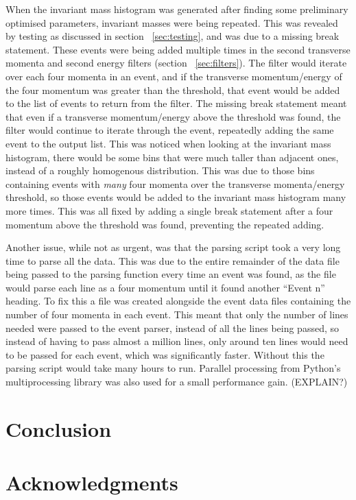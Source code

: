 \documentclass[11pt]{amsart}
\begin{document}
\begin{multicols}{2}
When the invariant mass histogram was generated after finding some preliminary optimised parameters, invariant masses were being repeated. This was revealed by testing as discussed in section ~\ref{sec:testing}, and was due to a missing break statement. These events were being added multiple times in the second transverse momenta and second energy filters (section ~\ref{sec:filters}). The filter would iterate over each four momenta in an event, and if the transverse momentum/energy of the four momentum was greater than the threshold, that event would be added to the list of events to return from the filter. The missing break statement meant that even if a transverse momentum/energy above the threshold was found, the filter would continue to iterate through the event, repeatedly adding the same event to the output list. This was noticed when looking at the invariant mass histogram, there would be some bins that were much taller than adjacent ones, instead of a roughly homogenous distribution. This was due to those bins containing events with \textit{many} four momenta over the transverse momenta/energy threshold, so those events would be added to the invariant mass histogram many more times. This was all fixed by adding a single break statement after a four momentum above the threshold was found, preventing the repeated adding.

Another issue, while not as urgent, was that the parsing script took a very long time to parse all the data. This was due to the entire remainder of the data file being passed to the parsing function every time an event was found, as the file would parse each line as a four momentum until it found another ``Event n'' heading. To fix this a file was created alongside the event data files containing the number of four momenta in each event. This meant that only the number of lines needed were passed to the event parser, instead of all the lines being passed, so instead of having to pass almost a million lines, only around ten lines would need to be passed for each event, which was significantly faster. Without this the parsing script would take many hours to run. Parallel processing from Python's multiprocessing library was also used for a small performance gain. (EXPLAIN?)

\section{Conclusion}

\section{Acknowledgments}


\end{multicols}
\end{document}
